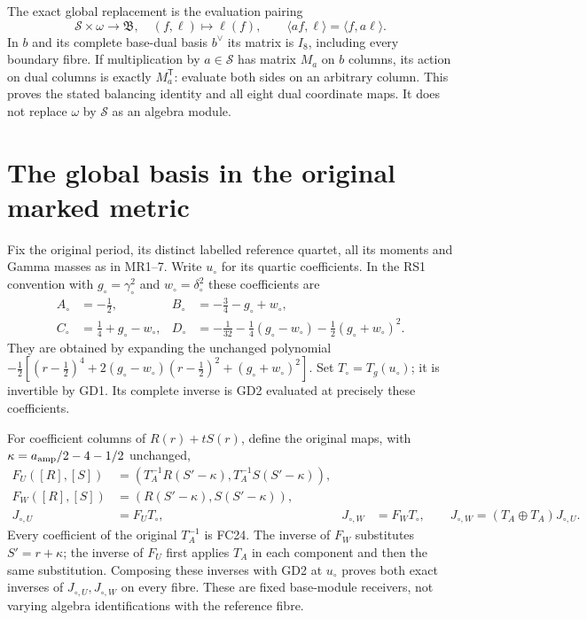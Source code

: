 \documentclass[11pt]{article}
\begin{document}
The exact global replacement is the evaluation pairing
\begin{equation}
 \mathscr S\times\omega\longrightarrow\mathfrak B,
 \quad(f,\ell)\longmapsto\ell(f),\qquad
 \langle af,\ell\rangle=\langle f,a\ell\rangle.
 \tag{GD12}
\end{equation}
In $b$ and its complete base-dual basis $b^\vee$ its
matrix is $I_8$, including every boundary fibre.
If multiplication by $a\in\mathscr S$ has matrix $M_a$
on $b$ columns, its action on dual columns is exactly
$M_a^{\mathsf T}$: evaluate both sides on an arbitrary
column. This proves the stated balancing identity and
all eight dual coordinate maps. It does not replace
$\omega$ by $\mathscr S$ as an algebra module.

\section{The global basis in the original marked metric}
Fix the original period, its distinct labelled reference
quartet, all its moments and Gamma masses as in MR1--7.
Write $u_\circ$ for its quartic coefficients. In the
RS1 convention with $g_\circ=\gamma_\circ^2$ and
$w_\circ=\delta_\circ^2$ these coefficients are
\begin{equation}
 \begin{aligned}
 A_\circ&=-\tfrac12,&B_\circ&=-\tfrac34-g_\circ+w_\circ,\\
 C_\circ&=\tfrac14+g_\circ-w_\circ,&
 D_\circ&=-\tfrac1{32}-\tfrac14(g_\circ-w_\circ)
                         -\tfrac12(g_\circ+w_\circ)^2.
 \end{aligned}\tag{GD13}
\end{equation}
They are obtained by expanding the unchanged polynomial
$-\tfrac12[(r-\tfrac12)^4+2(g_\circ-w_\circ)(r-\tfrac12)^2
 +(g_\circ+w_\circ)^2]$. Set $T_\circ=T_g(u_\circ)$;
it is invertible by GD1. Its complete inverse is GD2
evaluated at precisely these coefficients.

For coefficient columns of $R(r)+tS(r)$, define the
original maps, with $\kappa=a_{\rm amp}/2-4-1/2$ unchanged,
\begin{equation}
\begin{aligned}
 F_U([R],[S])&=(T_A^{-1}R(S'-\kappa),T_A^{-1}S(S'-\kappa)),\\
 F_W([R],[S])&=(R(S'-\kappa),S(S'-\kappa)),\\
 J_{\circ,U}&=F_UT_\circ,&J_{\circ,W}&=F_WT_\circ,
 \qquad J_{\circ,W}=(T_A\oplus T_A)J_{\circ,U}.
\end{aligned}\tag{GD14}
\end{equation}
Every coefficient of the original $T_A^{-1}$ is FC24.
The inverse of $F_W$ substitutes $S'=r+\kappa$;
the inverse of $F_U$ first applies $T_A$ in each
component and then the same substitution. Composing
these inverses with GD2 at $u_\circ$ proves both exact
inverses of $J_{\circ,U},J_{\circ,W}$ on every fibre.
These are fixed base-module receivers, not varying
algebra identifications with the reference fibre.
\end{document}
